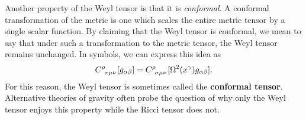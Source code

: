 \documentclass[10pt]{article}
\begin{document}
    \par Another property of the Weyl tensor is that it is \textit{conformal}. A conformal transformation of the metric is one which scales the entire metric tensor by a single scalar function. By claiming that the Weyl tensor is conformal, we mean to say that under such a transformation to the metric tensor, the Weyl tensor remains unchanged. In symbols, we can express this idea as
   \begin{align}
    	\tensor{C}{^\rho_\sigma_\mu_\nu}[g_{\alpha\beta}] = \tensor{C}{^\rho_\sigma_\mu_\nu}[\Omega^2(x^\gamma)g_{\alpha\beta}] . \notag
    \end{align}
     For this reason, the Weyl tensor is sometimes called the \textbf{conformal tensor}. Alternative theories of gravity often probe the question of why only the Weyl tensor enjoys this property while the Ricci tensor does not. 
\end{document}
